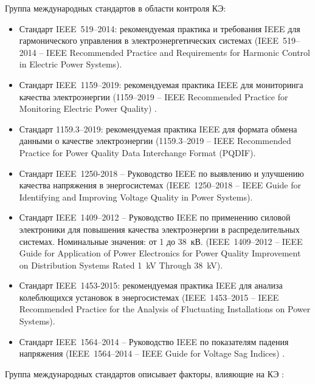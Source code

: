 Группа международных стандартов в области контроля КЭ:
\begin{itemize}
	\item Стандарт IEEE~519--2014: рекомендуемая практика и требования IEEE для гармонического управления в электроэнергетических системах (IEEE~519--2014 -- IEEE Recommended Practice and Requirements for Harmonic Control in Electric Power Systems)\cite{IEEE_519-2014}. 
	\item Стандарт IEEE~1159--2019: рекомендуемая практика IEEE для мониторинга качества электроэнергии (1159--2019 -- IEEE Recommended Practice for Monitoring Electric Power Quality) \cite{IEEE_1159-2019}. 
	\item Стандарт 1159.3--2019: рекомендуемая практика IEEE для формата обмена данными о качестве электроэнергии (1159.3--2019 -- IEEE Recommended Practice for Power Quality Data Interchange Format (PQDIF)\cite{IEEE_1159.3-2019}.
	\item Стандарт IEEE~1250-2018 -- Руководство IEEE по выявлению и улучшению качества напряжения в энергосистемах (IEEE~1250--2018 -- IEEE Guide for Identifying and Improving Voltage Quality in Power Systems)\cite{IEEE_1250-2018}.
	\item Стандарт IEEE~1409--2012 -- Руководство IEEE по применению силовой электроники для повышения качества электроэнергии в распределительных системах. Номинальные значения: от 1 до 38~кВ. (IEEE~1409--2012 -- IEEE Guide for Application of Power Electronics for Power Quality Improvement on Distribution Systems Rated 1~kV Through 38~kV)\cite{IEEE_1409-2012}.
	\item Стандарт IEEE~1453-2015: рекомендуемая практика IEEE для анализа колеблющихся установок в энергосистемах (IEEE~1453--2015 -- IEEE Recommended Practice for the Analysis of Fluctuating Installations on Power Systems).
	\item Стандарт IEEE~1564--2014 -- Руководство IEEE по показателям падения напряжения (IEEE~1564--2014 -- IEEE Guide for Voltage Sag Indices) \cite{IEEE_1453-2015}.
\end{itemize}

Группа международных стандартов описывает факторы, влияющие на КЭ \cite{IEEE_519-2014, IEEE_1159-2019, IEEE_1159.3-2019, IEEE_1250-2018, IEEE_1564-2014, IEEE_1409-2012, IEEE_1453-2015, IEEE_1159-2009}:

